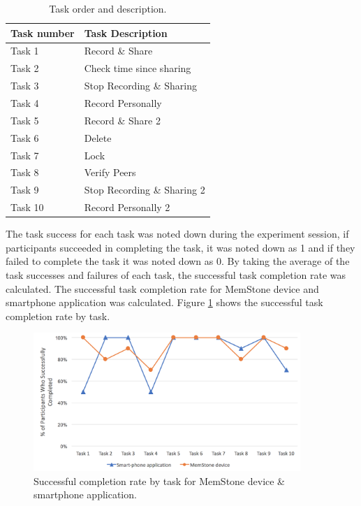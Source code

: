 \documentclass[mscthesis]{usiinfthesis}
\begin{document}
\begin{table}[!ht]
\centering
\begin{tabular}{|l|l|}
\hline
Task number & Task Description            \\ \hline
Task 1      & Record \& Share             \\ \hline
Task 2      & Check time since sharing    \\ \hline
Task 3      & Stop Recording \& Sharing   \\ \hline
Task 4      & Record Personally           \\ \hline
Task 5      & Record \& Share 2           \\ \hline
Task 6      & Delete                      \\ \hline
Task 7      & Lock                        \\ \hline
Task 8      & Verify Peers                \\ \hline
Task 9      & Stop Recording \& Sharing 2 \\ \hline
Task 10     & Record Personally 2         \\ \hline
\end{tabular}
\caption{Task order and description.}
\label{tab20}
\end{table}

The task success for each task was noted down during the experiment session, if participants succeeded in completing the task, it was noted down as 1 and if they failed to complete the task it was noted down as 0. By taking the average of the task successes and failures of each task, the successful task completion rate was calculated. The successful task completion rate for MemStone device and smartphone application was calculated. Figure \ref{fig22} shows the successful task completion rate by task. 

\begin{figure}[!ht] 
  \centering
  \includegraphics[width=0.9\textwidth]{tcm}
  \caption{Successful completion rate by task for MemStone device \& smartphone application.}
  \label{fig22}
\end{figure}
\end{document}

